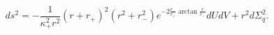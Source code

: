 \begin{equation}
ds^2=-\frac{1}{\kappa_+^2 r^2}(r+r_+)^2 (r^2+r_-^2)e^{-2\frac{r_-}{r_+}\arctan \frac{r}{r_-}}dUdV
+r^2d\Sigma_q^2.
\end{equation}

